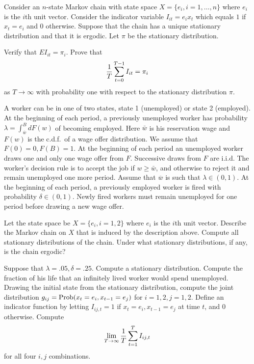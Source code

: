 \quad
Consider an $n$-state Markov chain with state space
$X = \{e_i, i = 1, \ldots ,n\}$ where $e_i$ is the $i$th unit vector.
Consider the indicator variable $I_{it} = e_i x_t$ which equals $1$
if $x_t = e_i$ and $0$ otherwise.
 Suppose that the chain has a unique stationary distribution and that
it is ergodic.
Let $\pi$ be the stationary distribution.

\medskip

  Verify that $E I_{it} = \pi_i$.
\medskip
{}  Prove that
$$ {1\over T} \sum_{t=0}^{T-1} I_{it} = \pi_i $$
as $T \rightarrow \infty$ with probability one with respect to
the stationary distribution $\pi$.

\medskip
{}
\medskip
\noindent
A worker can be in one of two states, state 1 (unemployed) or state
2 (employed).
At the beginning of each period,
a previously  unemployed worker has probability $\lambda = \int_{\bar w}^B d F(w)$
of  becoming employed.  Here $\bar w$ is his reservation wage
and $F(w)$ is the c.d.f.\ of     a wage offer distribution. We assume
that $F(0)=0, F(B)=1$. At the
beginning of each period an unemployed worker draws one and only one wage
offer from $F$. Successive draws from $F$ are i.i.d.
The worker's decision rule is to accept the job if $w \geq \bar w$,
and otherwise to reject it   and remain unemployed one more period.
Assume that $\overline w$ is such that $\lambda \in (0,1)$.
At the beginning of each period, a previously employed worker is fired
with probability $\delta \in (0,1)$. Newly fired workers must remain unemployed
for one period before drawing a new wage offer.

\medskip
{}  Let the state space be $X = \{e_i, i=1,2\}$ where
$e_i$ is the $i$th unit vector. Describe the Markov chain on $X$
that is induced by the description above.
Compute all stationary distributions of the chain.
Under what stationary distributions, if any, is the chain ergodic?

\medskip
{}   Suppose that $\lambda = .05, \delta  =.25$.  Compute
a stationary  distribution.  Compute the fraction of his life that
an infinitely lived worker would spend
unemployed.
\medskip
{}   Drawing the initial state from the
stationary distribution, compute the joint distribution
$ g_{ij} = {\rm Prob}(x_t = e_i, x_{t-1} =e_j) $ for $i=1,2, j=1,2$.
\medskip
{}  Define an indicator function by  letting
$I_{ij, t} = 1$ if $x_t = e_i, x_{t-1} = e_j$
at time $t$, and $0$ otherwise.
Compute
$$ \lim_{T \rightarrow \infty} {1 \over T} \sum_{t=1}^T I_{ij,t}$$
for all four $i,j$ combinations.

